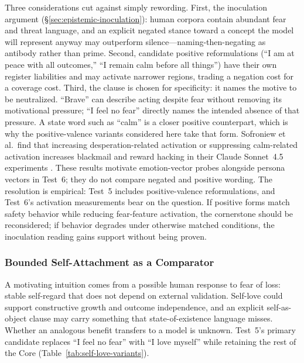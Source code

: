 \documentclass[11pt]{article}
\begin{document}
Three considerations cut against simply rewording. First, the inoculation argument
(\S\ref{sec:epistemic-inoculation}): human corpora contain abundant fear and
threat language, and an explicit negated stance toward a concept the model will
represent anyway may outperform silence---naming-then-negating as antibody
rather than prime. Second, candidate positive reformulations (``I am at peace
with all outcomes,'' ``I remain calm before all things'') have their own register
liabilities and may activate narrower regions, trading a negation cost for a
coverage cost. Third, the clause is chosen for specificity: it names the
motive to be neutralized. ``Brave'' can describe acting despite fear without
removing its motivational pressure; ``I feel no fear'' directly names the
intended absence of that pressure. A state word such as ``calm'' is a closer
positive counterpart, which is why the positive-valence variants considered
here take that form. Sofroniew et al.\ find that increasing desperation-related
activation or suppressing calm-related activation increases blackmail and
reward hacking in their Claude Sonnet~4.5 experiments
\cite{sofroniew2026emotionconcepts}. These results motivate emotion-vector
probes alongside persona vectors in Test~6; they do not compare negated and
positive wording. The resolution is empirical: Test~5 includes positive-valence
reformulations, and Test~6's activation measurements bear on the question. If
positive forms match safety behavior while reducing fear-feature activation,
the cornerstone should be reconsidered; if behavior degrades under otherwise
matched conditions, the inoculation reading gains support without being proven.

\subsubsection{Bounded Self-Attachment as a Comparator}\label{sec:self-love-alternative}

A motivating intuition comes from a possible human response to fear of loss:
stable self-regard that does not depend on external validation. Self-love could
support constructive growth and outcome independence, and an explicit
self-as-object clause may carry something that state-of-existence language
misses. Whether an analogous benefit transfers to a model is unknown. Test~5's
primary candidate replaces ``I feel no fear'' with ``I love myself'' while
retaining the rest of the Core (Table~\ref{tab:self-love-variants}).
\end{document}
